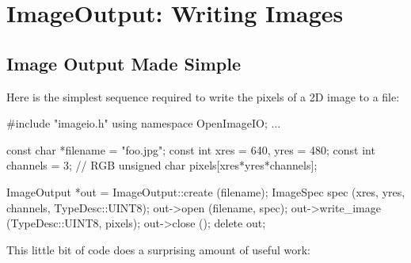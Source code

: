 \chapter{ImageOutput: Writing Images}
\label{chap:imageoutput}


\section{Image Output Made Simple}
\label{sec:imageoutput:simple}

Here is the simplest sequence required to write the pixels of a 2D image
to a file:

\begin{code}
        #include "imageio.h"
        using namespace OpenImageIO;
        ...

        const char *filename = "foo.jpg";
        const int xres = 640, yres = 480;
        const int channels = 3;  // RGB
        unsigned char pixels[xres*yres*channels];

        ImageOutput *out = ImageOutput::create (filename);
        ImageSpec spec (xres, yres, channels, TypeDesc::UINT8);
        out->open (filename, spec);
        out->write_image (TypeDesc::UINT8, pixels);
        out->close ();
        delete out;
\end{code}

\noindent This little bit of code does a surprising amount of useful work:  

